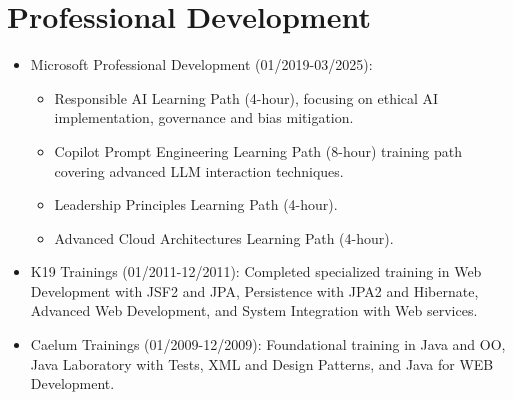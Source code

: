 
\section{Professional Development}
\begin{itemize}
    \item \footnotesize{Microsoft Professional Development (01/2019-03/2025):}
    \begin{itemize}
        \item \scriptsize{Responsible AI Learning Path (4-hour), focusing on ethical AI implementation, governance and bias mitigation.}
        \item \scriptsize{Copilot Prompt Engineering Learning Path (8-hour) training path covering advanced LLM interaction techniques.}
        \item \scriptsize{Leadership Principles Learning Path (4-hour).}
        \item \scriptsize{Advanced Cloud Architectures Learning Path (4-hour).}
    \end{itemize}
    \item \footnotesize{K19 Trainings (01/2011-12/2011):}\scriptsize{ Completed specialized training in Web Development with JSF2 and JPA, Persistence with JPA2 and Hibernate, Advanced Web Development, and System Integration with Web services.}
    \item \footnotesize{Caelum Trainings (01/2009-12/2009):}\scriptsize{ Foundational training in Java and OO, Java Laboratory with Tests, XML and Design Patterns, and Java for WEB Development.}
\end{itemize}